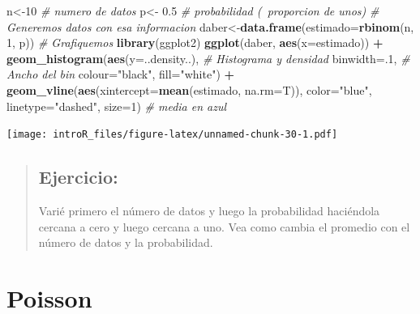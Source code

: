 \documentclass[
]{book}
\newenvironment{Shaded}{\begin{snugshade}}{\end{snugshade}}
\newcommand{\CommentTok}[1]{\textcolor[rgb]{0.56,0.35,0.01}{\textit{#1}}}
\newcommand{\DataTypeTok}[1]{\textcolor[rgb]{0.13,0.29,0.53}{#1}}
\newcommand{\DecValTok}[1]{\textcolor[rgb]{0.00,0.00,0.81}{#1}}
\newcommand{\FloatTok}[1]{\textcolor[rgb]{0.00,0.00,0.81}{#1}}
\newcommand{\KeywordTok}[1]{\textcolor[rgb]{0.13,0.29,0.53}{\textbf{#1}}}
\newcommand{\NormalTok}[1]{#1}
\newcommand{\OperatorTok}[1]{\textcolor[rgb]{0.81,0.36,0.00}{\textbf{#1}}}
\newcommand{\StringTok}[1]{\textcolor[rgb]{0.31,0.60,0.02}{#1}}
\begin{document}
\begin{Shaded}
\begin{Highlighting}[]
\NormalTok{n<-}\DecValTok{10} \CommentTok{# numero de datos}
\NormalTok{p<-}\StringTok{ }\FloatTok{0.5} \CommentTok{# probabilidad (~proporcion de unos)}
\CommentTok{# Generemos datos con esa informacion }
\NormalTok{daber<-}\KeywordTok{data.frame}\NormalTok{(}\DataTypeTok{estimado=}\KeywordTok{rbinom}\NormalTok{(n, }\DecValTok{1}\NormalTok{, p)) }
\CommentTok{# Grafiquemos }
\KeywordTok{library}\NormalTok{(ggplot2)}
\KeywordTok{ggplot}\NormalTok{(daber, }\KeywordTok{aes}\NormalTok{(}\DataTypeTok{x=}\NormalTok{estimado)) }\OperatorTok{+}\StringTok{ }
\StringTok{    }\KeywordTok{geom_histogram}\NormalTok{(}\KeywordTok{aes}\NormalTok{(}\DataTypeTok{y=}\NormalTok{..density..), }\CommentTok{# Histograma y densidad }
                   \DataTypeTok{binwidth=}\NormalTok{.}\DecValTok{1}\NormalTok{, }\CommentTok{# Ancho del bin}
                   \DataTypeTok{colour=}\StringTok{"black"}\NormalTok{, }\DataTypeTok{fill=}\StringTok{"white"}\NormalTok{) }\OperatorTok{+}\StringTok{ }
\StringTok{        }\KeywordTok{geom_vline}\NormalTok{(}\KeywordTok{aes}\NormalTok{(}\DataTypeTok{xintercept=}\KeywordTok{mean}\NormalTok{(estimado, }\DataTypeTok{na.rm=}\NormalTok{T)), }
          \DataTypeTok{color=}\StringTok{"blue"}\NormalTok{, }\DataTypeTok{linetype=}\StringTok{"dashed"}\NormalTok{, }\DataTypeTok{size=}\DecValTok{1}\NormalTok{) }\CommentTok{# media en azul}
\end{Highlighting}
\end{Shaded}

\texttt{[image: introR\_files/figure-latex/unnamed-chunk-30-1.pdf]}

\begin{quote}
\hypertarget{ejercicio-6}{%
\subsection{Ejercicio:}\label{ejercicio-6}}

Varié primero el número de datos y luego la probabilidad haciéndola cercana a cero y luego cercana a uno. Vea como cambia el promedio con el número de datos y la probabilidad.
\end{quote}

\hypertarget{poisson}{%
\section{Poisson}\label{poisson}}
\end{document}
